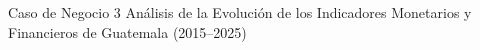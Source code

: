 Caso de Negocio 3
Análisis de la Evolución de los Indicadores Monetarios y Financieros de Guatemala (2015–2025)